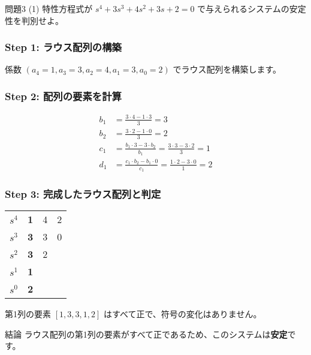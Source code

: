 \documentclass[11pt,a4paper]{ltjsarticle}
\begin{document}
\begin{problem}{問題3 (1)}
    特性方程式が $s^4+3s^3+4s^2+3s+2=0$ で与えられるシステムの安定性を判別せよ。
\end{problem}

\begin{solution}
    \subsubsection*{Step 1: ラウス配列の構築}
    係数 $(a_4=1, a_3=3, a_2=4, a_1=3, a_0=2)$ でラウス配列を構築します。
    
    \subsubsection*{Step 2: 配列の要素を計算}
    \begin{align*}
        b_1 &= \frac{3 \cdot 4 - 1 \cdot 3}{3} = 3 \\
        b_2 &= \frac{3 \cdot 2 - 1 \cdot 0}{3} = 2 \\
        c_1 &= \frac{b_1 \cdot 3 - 3 \cdot b_2}{b_1} = \frac{3 \cdot 3 - 3 \cdot 2}{3} = 1 \\
        d_1 &= \frac{c_1 \cdot b_2 - b_1 \cdot 0}{c_1} = \frac{1 \cdot 2 - 3 \cdot 0}{1} = 2
    \end{align*}

    \subsubsection*{Step 3: 完成したラウス配列と判定}
    \begin{center}
    \begin{tabular}{c|ccc}
        \toprule
        $s^4$ & \textbf{1} & 4 & 2 \\
        $s^3$ & \textbf{3} & 3 & 0 \\
        $s^2$ & \textbf{3} & 2 & \\
        $s^1$ & \textbf{1} & & \\
        $s^0$ & \textbf{2} & & \\
        \bottomrule
    \end{tabular}
    \end{center}
    第1列の要素 $[1, 3, 3, 1, 2]$ はすべて正で、符号の変化はありません。
\end{solution}

\begin{conclusion}{結論}
    ラウス配列の第1列の要素がすべて正であるため、このシステムは\textbf{安定}です。
\end{conclusion}
\end{document}
